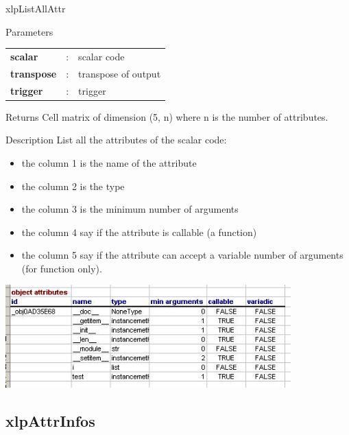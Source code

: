 \begin{xlpfunctitle}{xlpListAllAttr}

\begin{xlpfunc}{Parameters}
\begin{tabular}{p{3.5cm}cl}
\textbf{scalar}& : & scalar code \\
\textbf{transpose}& : & transpose of output \\
\textbf{trigger}& : & trigger 
\end{tabular}
\end{xlpfunc}


\begin{xlpfunc}{Returns}
Cell matrix of dimension (5, n) where n is the number of attributes.
\end{xlpfunc}

\begin{xlpfunc}{Description}
List all the attributes of the scalar code:
\begin{itemize}
\item the column 1 is the name of the attribute 
\item the column 2 is the type
\item the column 3 is the minimum number of arguments
\item the column 4 say if the attribute is callable (a function)
\item the column 5 say if the attribute can accept a variable number of arguments (for function only).
\end{itemize}

\includegraphics[width=11cm]{images/listallattr.jpg}
\end{xlpfunc}
\end{xlpfunctitle}

\subsection{xlpAttrInfos}

